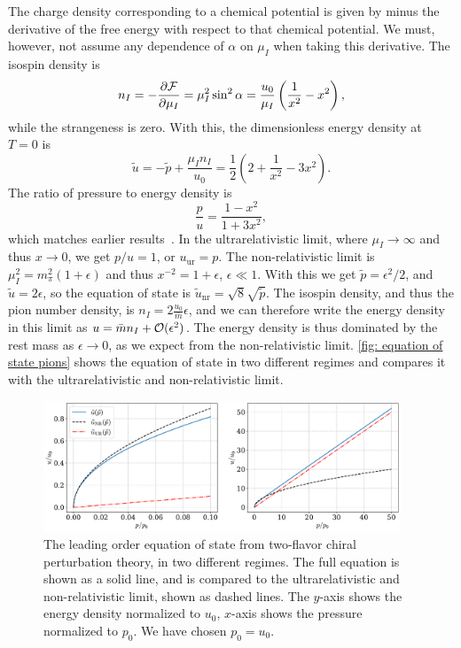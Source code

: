 %
The charge density corresponding to a chemical potential is given by minus the derivative of the free energy with respect to that chemical potential. 
We must, however, not assume any dependence of $\alpha$ on $\mu_I$ when taking this derivative.
The isospin density is
%
\begin{equation}
    \label{isospin density}
    n_I = -\pdv{\mathcal{F}}{\mu_I} = \mu_I^2 \sin^2 \alpha 
    = 
    \frac{u_0}{\mu_I} \left(\frac{1}{x^2} - x^2\right),
\end{equation}
%
while the strangeness is zero.
With this, the dimensionless energy density at $T = 0$ is
%
\begin{equation}
    \label{energy density leading order chpt}
    \tilde u = - \tilde p + \frac{\mu_I n_I}{u_0}
    = \frac{1}{2} \left( 2 + \frac{1}{x^2} - 3 x^2\right).
\end{equation}
% 
The ratio of pressure to energy density is
%
\begin{equation} 
    \label{pressure energy ratio leading order chpt}
    \frac{p}{u} = \frac{1- x^2}{1+3x^2},
\end{equation}
%
which matches earlier results~\autocite{sonQCDFiniteIsospin2001}.
In the ultrarelativistic limit, where $\mu_I \rightarrow \infty$ and thus $x \rightarrow 0$, we get $p / u = 1$, or $u_\text{ur} = p$.
The non-relativistic limit is $\mu_I^2 = m_\pi^2(1 + \epsilon)$ and thus $x^{-2} = 1 + \epsilon$, $\epsilon \ll 1$.
With this we get $\tilde p = \epsilon^2 / 2 $, and $\tilde u = 2\epsilon$, so the equation of state is $\tilde u_\text{nr} = \sqrt 8 \sqrt{\tilde p}$.
The isospin density, and thus the pion number density, is $n_I = 2 \frac{u_0}{\bar m} \epsilon$, and we can therefore write the energy density in this limit as $u = \bar m n_I + \mathcal O(\epsilon^2)$.
The energy density is thus dominated by the rest mass as $\epsilon \rightarrow 0$, as we expect from the non-relativistic limit.
\autoref{fig: equation of state pions} shows the equation of state in two different regimes and compares it with the ultrarelativistic and non-relativistic limit.

\begin{figure}[h]
    \centering
    \includegraphics[width=0.95\textwidth]{../scripts/figurer/pion_star/pion_eos.pdf}
    \caption{
        The leading order equation of state from two-flavor chiral perturbation theory, in two different regimes.
        The full equation is shown as a solid line, and is compared to the ultrarelativistic and non-relativistic limit, shown as dashed lines. 
        The $y$-axis shows the energy density normalized to $u_0$, $x$-axis shows the pressure normalized to $p_0$.
        We have chosen $p_0 = u_0$.
    }
    \label{fig: equation of state pions}
\end{figure}



